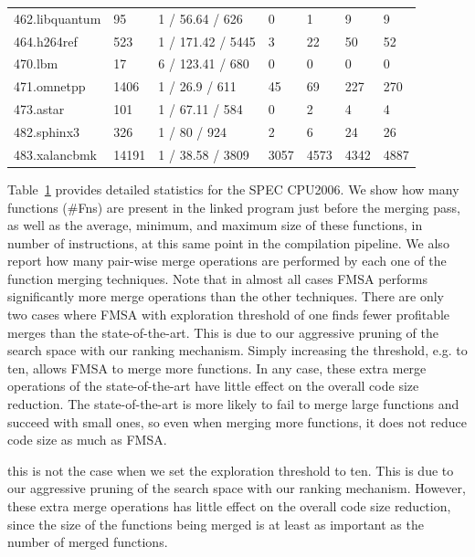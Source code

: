 \begin{table}[h]
{\begin{tabular}{lllllll}
                     462.libquantum     & 95     & 1 / 56.64 / 626    & \small 0      & \small 1     & \small 9    & \small 9    \\
\rowcolor{evencolor} 464.h264ref        & 523    & 1 / 171.42 / 5445  & \small 3      & \small 22    & \small 50   & \small 52   \\
                     470.lbm            & 17     & 6 / 123.41 / 680   & \small 0      & \small 0     & \small 0    & \small 0    \\
\rowcolor{evencolor} 471.omnetpp        & 1406   & 1 / 26.9 / 611     & \small 45     & \small 69    & \small 227  & \small 270  \\
                     473.astar          & 101    & 1 / 67.11 / 584    & \small 0      & \small 2     & \small 4    & \small 4    \\
\rowcolor{evencolor} 482.sphinx3        & 326    & 1 / 80 / 924       & \small 2      & \small 6     & \small 24   & \small 26   \\
                     483.xalancbmk      & 14191  & 1 / 38.58 / 3809   & \small 3057   & \small 4573  & \small 4342 & \small 4887 \\
\bottomrule
\end{tabular}
}
\label{tab:stats}
\end{table}

Table~\ref{tab:stats} provides detailed statistics for the SPEC CPU2006.
We show how many functions (\#Fns) are present in the linked program
just before the merging pass, as well as
the average, minimum, and maximum size of these functions, in number of instructions, at
this same point in the compilation pipeline.
We also report how many pair-wise merge operations are
performed by each one of the function merging techniques.
Note that in almost all cases FMSA performs significantly more merge operations than the other
techniques.
There are only two cases where FMSA with exploration threshold of one finds fewer
profitable merges than the state-of-the-art. This is due to our aggressive pruning
of the search space with our ranking mechanism. Simply increasing the threshold, e.g. to ten,
allows FMSA to merge more functions. In any case, these extra merge operations of the state-of-the-art
have little effect on the overall code size reduction. The state-of-the-art is more likely to fail to
merge large functions and succeed with small ones, so even when merging more functions, it does not
reduce code size as much as FMSA.

this is not the case when
we set the exploration threshold to ten.
This is due to our aggressive pruning of the search space with our ranking
mechanism.
However, these extra merge operations has little effect on the overall code size reduction,
since the size of the functions being merged is at least as important as the number of merged functions.

